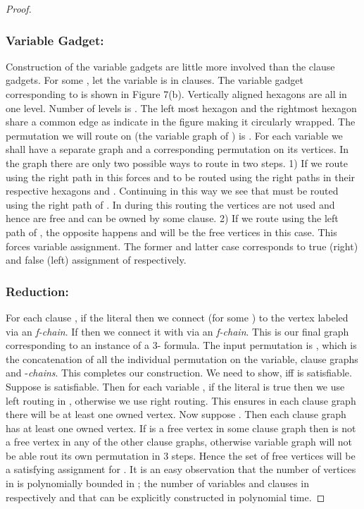\documentclass[runningheads,a4paper]{llncs}
\begin{document}
\begin{proof}
	\subsubsection{Variable Gadget:} Construction of the variable gadgets are little more involved than the clause gadgets. For some , let the variable  is in  clauses. The variable gadget corresponding to  is shown in Figure 7(b). Vertically aligned hexagons are all in one level. Number of levels is . The left most hexagon  and the rightmost hexagon  share a common edge as indicate in the figure making it circularly wrapped. The permutation we will route on  (the variable graph of ) is . For each variable we shall have a separate graph and a corresponding permutation on its vertices. In the graph  there are only two possible ways to route  in two steps. 1) If we route  using the right path in  this forces  and  to be routed using the right paths in their respective hexagons  and . Continuing in this way we see that  must be routed using the right path of . In during this routing the vertices  are not used and hence are free and can be owned by some clause. 2) If we route  using the left path of , the opposite happens and  will be the free vertices in this case. This forces variable assignment. The former and latter case corresponds to true (right) and false (left) assignment of  respectively.
	
	\subsubsection{Reduction:} For each clause , if the literal   then we connect   (for some ) to the vertex labeled  via an \textit{f-chain}. If  then we connect it with  via an \textit{f-chain}. This is our final graph  corresponding to an instance of a 3- formula. The input permutation is , which is the concatenation of all the individual permutation on the variable, clause  graphs and -\textit{chains}.  This completes our construction. We need to show,  iff  is satisfiable. Suppose  is satisfiable. Then for each variable , if the literal  is true then we use left routing in , otherwise we use right routing. This ensures in each clause graph there will be at least one owned vertex.  Now suppose . Then each clause graph has at least one owned vertex. If  is a free vertex in some clause graph then  is not a free vertex in any of the other clause graphs, otherwise variable graph  will not be able rout its own permutation in 3 steps. Hence the set of free vertices will be a satisfying assignment for . It is an easy observation that the number of vertices in  is polynomially bounded in ; the number of variables and clauses in  respectively and that  can be explicitly constructed in polynomial time.
	
	
\end{proof}
\end{document}
